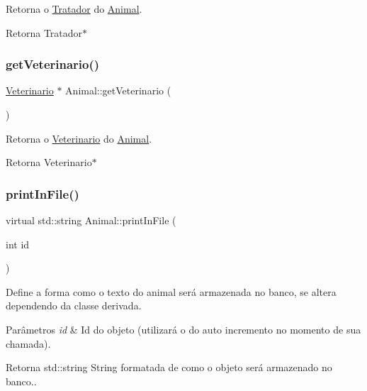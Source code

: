 Retorna o \hyperlink{classTratador}{Tratador} do \hyperlink{classAnimal}{Animal}. 

\begin{DoxyReturn}{Retorna}
Tratador$\ast$ 
\end{DoxyReturn}
\mbox{\label{classAnimal_a2c8aacd4e6709ae559c4b17d6856a3df}} 
\subsubsection{\texorpdfstring{get\+Veterinario()}{getVeterinario()}}
{\footnotesize\ttfamily \hyperlink{classVeterinario}{Veterinario} $\ast$ Animal\+::get\+Veterinario (\begin{DoxyParamCaption}{ }\end{DoxyParamCaption})}



Retorna o \hyperlink{classVeterinario}{Veterinario} do \hyperlink{classAnimal}{Animal}. 

\begin{DoxyReturn}{Retorna}
Veterinario$\ast$ 
\end{DoxyReturn}
\mbox{\label{classAnimal_ac75406040726a6339932d70164cc7242}} 
\subsubsection{\texorpdfstring{print\+In\+File()}{printInFile()}}
{\footnotesize\ttfamily virtual std\+::string Animal\+::print\+In\+File (\begin{DoxyParamCaption}\item[{int}]{id }\end{DoxyParamCaption})\hspace{0.3cm}{\ttfamily [pure virtual]}}



Define a forma como o texto do animal será armazenada no banco, se altera dependendo da classe derivada. 


\begin{DoxyParams}{Parâmetros}
{\em id} & Id do objeto (utilizará o do auto incremento no momento de sua chamada). \\
\hline
\end{DoxyParams}
\begin{DoxyReturn}{Retorna}
std\+::string String formatada de como o objeto será armazenado no banco.. 
\end{DoxyReturn}


